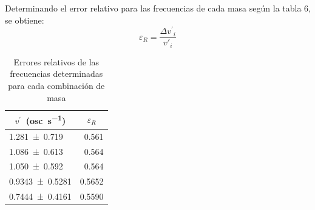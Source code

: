 \documentclass[../main.tex]{subfiles}
\begin{document}
Determinando el error relativo para las frecuencias de cada masa según la tabla 6, se obtiene:
\begin{equation*}
  \varepsilon_R = \frac{\Delta \mathit{v^\prime}_i}{\mathit{v'}_i}
\end{equation*}
\begin{table}[H]
  \caption{Errores relativos de las frecuencias determinadas para cada combinación de masa}
  \label{tab:theoError}
  \begin{center}
    \begin{tabular}[c]{lr}
      \toprule
      \multicolumn{1}{c}{$\mathit{v^\prime} \,$ (\unit{osc\per\second})} &
      \multicolumn{1}{c}{$\varepsilon_R$} \\
      \midrule
      \num{1.281 +- 0.719} & \num{0.561} \\
      \num{1.086 +- 0.613} & \num{0.564} \\
      \num{1.050 +- 0.592} & \num{0.564} \\
      \num{0.9343 +- 0.5281} & \num{0.5652} \\
      \num{0.7444 +- 0.4161} & \num{0.5590} \\
      \bottomrule
    \end{tabular}
  \end{center}
\end{table}
\end{document}
